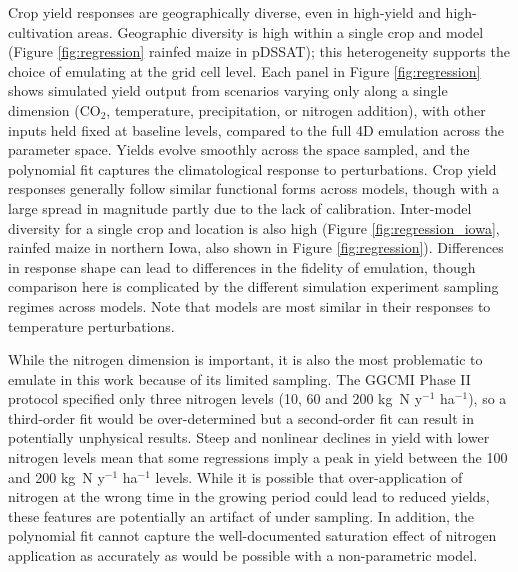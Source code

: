 \documentclass[esd, manuscript]{copernicus} %
\begin{document}
Crop yield responses are geographically diverse, even in high-yield and high-cultivation areas. Geographic diversity is high  within a single crop and model (Figure \ref{fig:regression} rainfed maize in pDSSAT); this heterogeneity supports the choice of emulating at the grid cell level. Each panel in Figure \ref{fig:regression} shows simulated yield output from scenarios varying only along a single dimension (CO$_2$, temperature, precipitation, or nitrogen addition), with other inputs held fixed at baseline levels, compared to the full 4D emulation across the parameter space. Yields evolve smoothly across the space sampled, and the polynomial fit captures the climatological response to perturbations. Crop yield responses generally follow similar functional forms across models, though with a large spread in magnitude partly due to the lack of calibration. Inter-model diversity for a single crop and location is also high (Figure \ref{fig:regression_iowa}, rainfed maize in northern Iowa, also shown in Figure \ref{fig:regression}). Differences in response shape can lead to  differences in the fidelity of emulation, though comparison here is complicated by the different simulation experiment sampling regimes across models. Note that models are most similar in their responses to temperature perturbations. 

While the nitrogen dimension is important, it is also the most problematic to emulate in this work because of its limited sampling. The GGCMI Phase II protocol specified only three nitrogen levels (10, 60 and 200 kg~N y$^{-1}$ ha$^{-1}$), so a third-order fit would be over-determined but a second-order fit can result in potentially unphysical results. Steep and nonlinear declines in yield with lower nitrogen levels mean that some regressions imply a peak in yield between the 100 and 200 kg~N y$^{-1}$ ha$^{-1}$ levels. While it is possible that over-application of nitrogen at the wrong time in the growing period could lead to reduced yields, these features are potentially an artifact of under sampling. In addition, the polynomial fit cannot capture the well-documented saturation effect of nitrogen application \citep[e.g.][]{Torsten77} as accurately as would be possible with a non-parametric model. 
\end{document}
